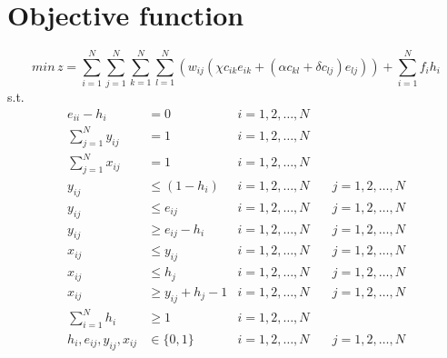 \documentclass[11pt]{article} %
\begin{document}
\section{Objective function}
$$min\,z=\sum^N_{i=1}\sum^N_{j=1}\sum^N_{k=1}\sum^N_{l=1}(w_{ij}(\chi c_{ik}e_{ik}+(\alpha c_{kl}+\delta c_{lj})e_{lj})) + \sum^N_{i=1}f_{i}h_{i}$$
s.t.
\begin{align*}
e_{ii}-h_{i} &= 0 &i=1,2,\ldots,N \quad&\\
\sum^N_{j=1}y_{ij} &= 1 &i=1,2,\ldots,N \quad&\\
\sum^N_{j=1}x_{ij} &=1 &i=1,2,\ldots,N \quad&\\
y_{ij} &\leq (1-h_i) &i=1,2,\ldots,N \quad& j=1,2,\ldots,N \\
y_{ij} &\leq e_{ij} &i=1,2,\ldots,N \quad& j=1,2,\ldots,N \\
y_{ij} &\geq e_{ij}-h_i &i=1,2,\ldots,N \quad& j=1,2,\ldots,N \\
x_{ij} &\leq y_{ij} &i=1,2,\ldots,N \quad& j=1,2,\ldots,N \\
x_{ij} &\leq h_j &i=1,2,\ldots,N \quad& j=1,2,\ldots,N \\
x_{ij} &\geq y_{ij} + h_j - 1 &i=1,2,\ldots,N \quad& j=1,2,\ldots,N \\
\sum^N_{i=1}h_{i} &\geq 1 &i=1,2,\ldots,N \quad& \\
h_i, e_{ij}, y_{ij}, x_{ij} &\in \{0,1\} &i=1,2,\ldots,N \quad& j=1,2,\ldots,N \\
\end{align*}
\end{document}
